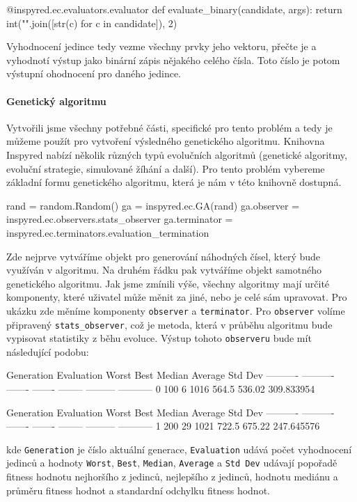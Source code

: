 \begin{code}
@inspyred.ec.evaluators.evaluator
def evaluate_binary(candidate, args):
    return int("".join([str(c) for c in candidate]), 2)
\end{code}

Vyhodnocení jedince tedy vezme všechny prvky jeho vektoru, přečte je a
vyhodnotí výstup jako binární zápis nějakého celého čísla. Toto číslo je potom
výstupní ohodnocení pro daného jedince.

\paragraph{Genetický algoritmu}
Vytvořili jsme všechny potřebné části, specifické pro tento problém a tedy je
můžeme použít pro vytvoření výsledného genetického algoritmu. Knihovna Inspyred
nabízí několik různých typů evolučních algoritmů (genetické algoritmy, evoluční
strategie, simulované žíhání a další). Pro tento problém vybereme
základní formu genetického algoritmu, která je nám v této knihovně dostupná.

\begin{code}
rand = random.Random()
ga = inspyred.ec.GA(rand)
ga.observer = inspyred.ec.observers.stats_observer
ga.terminator = inspyred.ec.terminators.evaluation_termination
\end{code}

Zde nejprve vytváříme objekt pro generování náhodných čísel, který bude
využíván v algoritmu. Na druhém řádku pak vytváříme objekt samotného
genetického algoritmu. Jak jsme zmínili výše, všechny algoritmy mají určité
komponenty, které uživatel může měnit za jiné, nebo je celé sám upravovat. Pro
ukázku zde měníme komponenty \texttt{observer} a \texttt{terminator}. Pro
\texttt{observer} volíme připravený \texttt{stats\_observer}, což je metoda,
která v průběhu algoritmu bude vypisovat statistiky z běhu evoluce. Výstup
tohoto \texttt{observeru} bude mít následující podobu:

\begin{code}
Generation Evaluation   Worst    Best   Median   Average     Std Dev
---------- ---------- ------- ------- -------- --------- -----------      
         0        100       6    1016    564.5    536.02  309.833954

Generation Evaluation   Worst    Best   Median   Average     Std Dev
---------- ---------- ------- ------- -------- --------- -----------     
         1        200      29    1021    722.5    675.22  247.645576
\end{code}
kde \texttt{Generation} je číslo aktuální generace, \texttt{Evaluation} udává
počet vyhodnocení jedinců a hodnoty \texttt{Worst}, \texttt{Best},
\texttt{Median}, \texttt{Average} a \texttt{Std Dev} udávají popořadě fitness
hodnotu nejhoršího z jedinců, nejlepšího z jedinců, hodnotu mediánu a průměru
fitness hodnot a standardní odchylku fitness hodnot.

